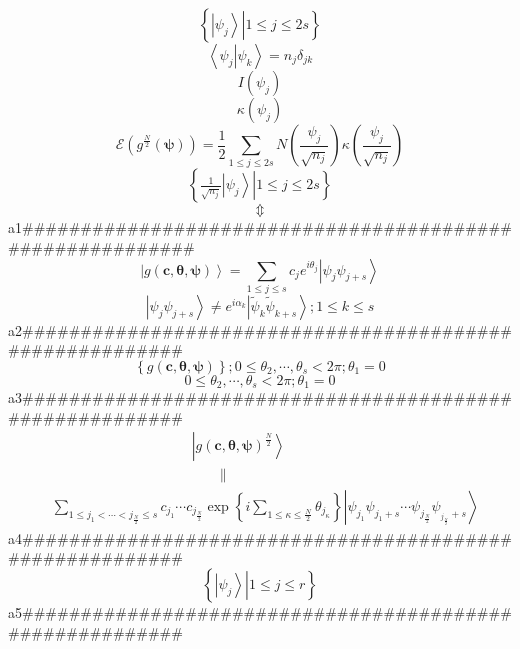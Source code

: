 \documentclass[aps,preprint]{revtex4}%
\begin{document}
\[
\left\{  \left.  \left\vert \psi_{j}\right\rangle \right\vert 1\leq
j\leq2s\right\}
\]%
\[
\left\langle \left.  \psi_{j}\right\vert \psi_{k}\right\rangle =n_{j}%
\delta_{jk}%
\]%
\[
I\left(  \psi_{j}\right)
\]%
\[
\kappa\left(  \psi_{j}\right)
\]%
\[
\mathcal{E}\left(  g^{\frac{N}{2}}\left(  \mathbf{\psi}\right)  \right)
=\frac{1}{2}%
{\textstyle\sum\limits_{1\leq j\leq2s}}
N\left(  \frac{\psi_{j}}{\sqrt{n_{j}}}\right)  \kappa\left(  \frac{\psi_{j}%
}{\sqrt{n_{j}}}\right)
\]%
\[
\left\{  \left.  \tfrac{1}{\sqrt{n_{j}}}\left\vert \overset{\left.  {}\right.
}{\psi_{j}}\right\rangle \right\vert 1\leq j\leq2s\right\}
\]%
\[
\Updownarrow
\]
a1\#\#\#\#\#\#\#\#\#\#\#\#\#\#\#\#\#\#\#\#\#\#\#\#\#\#\#\#\#\#\#\#\#\#\#\#\#\#\#\#\#\#\#\#\#\#\#\#\#\#\#\#\#\#\#\#\#\#%
\begin{equation}
\left\vert g\left(  \mathbf{c,\theta,\psi}\right)  \right\rangle =\sum_{1\leq
j\leq s}c_{j}e^{i\theta_{j}}\left\vert \psi_{j}\psi_{j+s}\right\rangle
\nonumber
\end{equation}%
\[
\left\vert \psi_{j}\psi_{j+s}\right\rangle \neq e^{i\alpha_{k}}\left\vert
\tilde{\psi}_{k}\tilde{\psi}_{k+s}\right\rangle ;1\leq k\leq s
\]
a2\#\#\#\#\#\#\#\#\#\#\#\#\#\#\#\#\#\#\#\#\#\#\#\#\#\#\#\#\#\#\#\#\#\#\#\#\#\#\#\#\#\#\#\#\#\#\#\#\#\#\#\#\#\#\#\#\#%
\[
\left\{  g\left(  \mathbf{c,\theta,\psi}\right)  \right\}  ;0\leq\theta
_{2},\cdots,\theta_{s}<2\pi;\theta_{1}=0
\]%
\[
0\leq\theta_{2},\cdots,\theta_{s}<2\pi;\theta_{1}=0
\]
a3\#\#\#\#\#\#\#\#\#\#\#\#\#\#\#\#\#\#\#\#\#\#\#\#\#\#\#\#\#\#\#\#\#\#\#\#\#\#\#\#\#\#\#\#\#\#\#\#\#\#\#\#\#\#\#\#\#%
\begin{align*}
&  \qquad\qquad\qquad\qquad\qquad\left\vert g\left(  \mathbf{c,\theta,\psi
}\right)  ^{\frac{N}{2}}\right\rangle \\
&  \qquad\qquad\qquad\qquad\qquad\qquad\left.  \parallel\right. \\
&  \sum_{1\leq j_{1}<\cdots<j_{\frac{N}{2}}\leq s}c_{j_{1}}\cdots
c_{j_{\frac{N}{2}}}\exp\left\{  i\sum\limits_{1\leq\kappa\leq\frac{N}{2}%
}\theta_{j_{\kappa}}\right\}  \left\vert \psi_{j_{1}}\psi_{j_{1}+s}\cdots
\psi_{j_{\frac{N}{2}}}\psi_{_{j_{\frac{N}{2}}}+s}\right\rangle
\end{align*}
a4\#\#\#\#\#\#\#\#\#\#\#\#\#\#\#\#\#\#\#\#\#\#\#\#\#\#\#\#\#\#\#\#\#\#\#\#\#\#\#\#\#\#\#\#\#\#\#\#\#\#\#\#\#\#\#\#\#%
\[
\left\{  \left.  \left\vert \psi_{j}\right\rangle \right\vert 1\leq j\leq
r\right\}
\]
a5\#\#\#\#\#\#\#\#\#\#\#\#\#\#\#\#\#\#\#\#\#\#\#\#\#\#\#\#\#\#\#\#\#\#\#\#\#\#\#\#\#\#\#\#\#\#\#\#\#\#\#\#\#\#\#\#\#%
\end{document}
